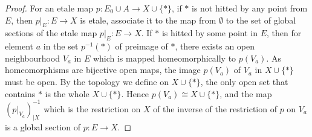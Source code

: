 \documentclass[a4paper]{article}
\begin{document}
\begin{proof}
    For an etale map $p:E_0\cup A\to X\cup \{*\}$, if $*$ is not hitted by any point from $E$, then $p|_{E}:E\to X$ is etale, associate it to the map from $\emptyset$ to the set of global sections of the etale map $p|_{E}:E\to X$. If $*$ is hitted by some point in $E$, then for element $a$ in the set $p^{-1}(*)$ of preimage of $*$, there exists an open neighbourhood $V_a$ in $E$ which is mapped homeomorphically to $p(V_a)$. As homeomorphisms are bijective open maps, the image $p(V_a)$ of $V_a$ in $X\cup \{*\}$ must be open. By the topology we define on $X\cup \{*\}$, the only open set that contains $*$ is the whole $X\cup \{*\}$. Hence $p(V_a)\cong X\cup \{*\}$, and the map $(p|_{V_a})^{-1}_{|X}$ which is the restriction on $X$ of the inverse of the restriction of $p$ on $V_a$ is a global section of $p:E\to X$.

  
\end{proof}
\end{document}
